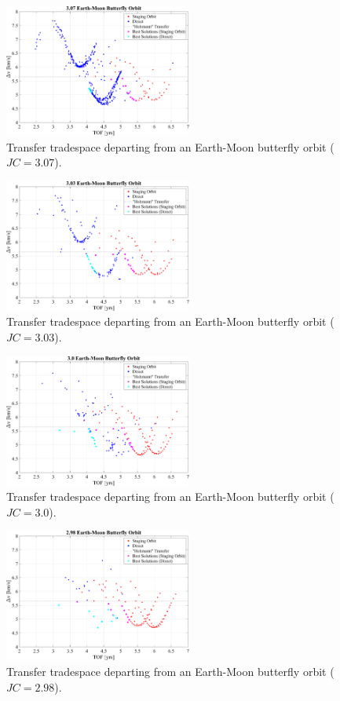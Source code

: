 \begin{figure}[ht]
    \centering
    \includegraphics[width=0.55\textwidth]{figures/TradeSpace_Butterfly_3_07.pdf}
    \caption{Transfer tradespace departing from an Earth-Moon butterfly orbit ($JC=3.07$).}
\end{figure}

\begin{figure}[ht]
    \centering
    \includegraphics[width=0.55\textwidth]{figures/TradeSpace_Butterfly_3_03.pdf}
    \caption{Transfer tradespace departing from an Earth-Moon butterfly orbit ($JC=3.03$).}
\end{figure}
\clearpage

\begin{figure}[ht]
    \centering
    \includegraphics[width=0.55\textwidth]{figures/TradeSpace_Butterfly_3_00.pdf}
    \caption{Transfer tradespace departing from an Earth-Moon butterfly orbit ($JC=3.0$).}
\end{figure}

\begin{figure}[ht]
    \centering
    \includegraphics[width=0.55\textwidth]{figures/TradeSpace_Butterfly_2_98.pdf}
    \caption{Transfer tradespace departing from an Earth-Moon butterfly orbit ($JC=2.98$).}
\end{figure}
\clearpage
